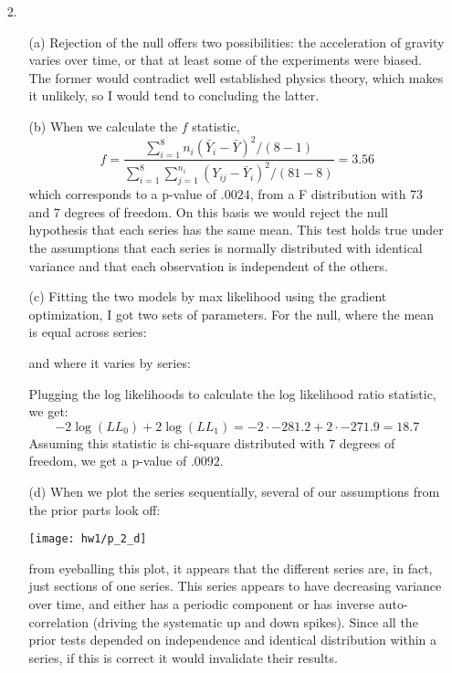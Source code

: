\documentclass[11pt]{article}
\theoremstyle{definition}
\begin{document}
\begin{itemize}
    \item[2.]  
        \begin{itemize}
            \item[(a)] Rejection of the null offers two possibilities: the acceleration of gravity varies over time, or that at least some of the experiments were biased. The former would contradict well established physics theory, which makes it unlikely, so I would tend to concluding the latter.
            \item[(b)] 
                When we calculate the $f$ statistic, 
                \[ f = \frac{\sum_{i=1}^{8} n_i (\bar Y_i - \bar Y)^2/(8-1)}{\sum_{i=1}^{8} \sum_{j=1}^{n_i} (Y_{ij} - \bar Y_i)^2/(81-8)} = 3.56 \]
                which corresponds to a p-value of $.0024$, from a F distribution with 73 and 7 degrees of freedom. On this basis we would reject the null hypothesis that each series has the same mean. This test holds true under the assumptions that each series is normally distributed with identical variance and that each observation is independent of the others.
            \item[(c)] 
                Fitting the two models by max likelihood using the gradient optimization, I got two sets of parameters. For the null, where the mean is equal across series:
                \FloatBarrier
                
                \FloatBarrier
                and where it varies by series:
                \FloatBarrier
                
                \FloatBarrier
                Plugging the log likelihoods to calculate the log likelihood ratio statistic, we get:
                \[-2\log(LL_0)+2\log(LL_1) = -2\cdot-281.2+2\cdot-271.9=18.7\]
                Assuming this statistic is chi-square distributed with $7$ degrees of freedom, we get a p-value of $.0092$.
            \item[(d)]
                When we plot the series sequentially, several of our assumptions from the prior parts look off:
                \begin{center}
                    \texttt{[image: hw1/p\_2\_d]}
                \end{center}
                from eyeballing this plot, it appears that the different series are, in fact, just sections of one series. This series appears to have decreasing variance over time, and either has a periodic component or has inverse auto-correlation (driving the systematic up and down spikes). Since all the prior tests depended on independence and identical distribution within a series, if this is correct it would invalidate their results. \\

\end{itemize}
\end{itemize}
\end{document}
